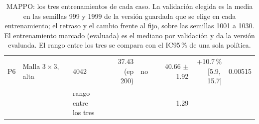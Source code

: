 \begin{table}[H]
\begin{tabular}{lllrlrrr}
P6 & \makecell[l]{Malla $3 \times 3$,\\{}alta} & 4042 & \makecell[r]{37.43\\{}(ep 200)} & no & \makecell[r]{40.66\\{}$\pm$ 1.92} & \makecell[r]{+10.7\,\%\\{}[5.9,\,15.7]} & 0.00515 \\
 & & \makecell[l]{rango entre\\{}los tres} & & & 1.29 & & \\
\bottomrule
\end{tabular}
\caption[Entrenamientos de MAPPO]{MAPPO: los tres entrenamientos de cada caso. La validación elegida es la media en las semillas 999 y 1999 de la versión guardada que se elige en cada entrenamiento; el retraso y el cambio frente al fijo, sobre las semillas 1001 a 1030. El entrenamiento marcado (evaluada) es el mediano por validación y da la versión evaluada. El rango entre los tres se compara con el IC95\,\% de una sola política.}
\label{tab:veredicto-bases-mappo}
\end{table}

